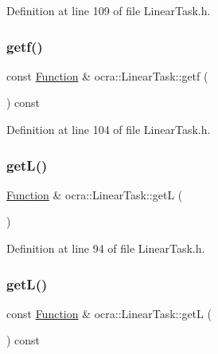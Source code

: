 Definition at line 109 of file Linear\+Task.\+h.

\hypertarget{classocra_1_1LinearTask_a19be592ae8046225f171a54c01d40583}{}\label{classocra_1_1LinearTask_a19be592ae8046225f171a54c01d40583} 
\subsubsection{\texorpdfstring{getf()}{getf()}\hspace{0.1cm}{\footnotesize\ttfamily [2/2]}}
{\footnotesize\ttfamily const \hyperlink{classocra_1_1Function}{Function} \& ocra\+::\+Linear\+Task\+::getf (\begin{DoxyParamCaption}{ }\end{DoxyParamCaption}) const\hspace{0.3cm}{\ttfamily [inline]}}



Definition at line 104 of file Linear\+Task.\+h.

\hypertarget{classocra_1_1LinearTask_a84dc8ca9c882d3e1b864e78784814303}{}\label{classocra_1_1LinearTask_a84dc8ca9c882d3e1b864e78784814303} 
\subsubsection{\texorpdfstring{get\+L()}{getL()}\hspace{0.1cm}{\footnotesize\ttfamily [1/2]}}
{\footnotesize\ttfamily \hyperlink{classocra_1_1Function}{Function} \& ocra\+::\+Linear\+Task\+::getL (\begin{DoxyParamCaption}{ }\end{DoxyParamCaption})\hspace{0.3cm}{\ttfamily [inline]}}



Definition at line 94 of file Linear\+Task.\+h.

\hypertarget{classocra_1_1LinearTask_acfca060d834f7141863d5f3d254d6c66}{}\label{classocra_1_1LinearTask_acfca060d834f7141863d5f3d254d6c66} 
\subsubsection{\texorpdfstring{get\+L()}{getL()}\hspace{0.1cm}{\footnotesize\ttfamily [2/2]}}
{\footnotesize\ttfamily const \hyperlink{classocra_1_1Function}{Function} \& ocra\+::\+Linear\+Task\+::getL (\begin{DoxyParamCaption}{ }\end{DoxyParamCaption}) const\hspace{0.3cm}{\ttfamily [inline]}}



